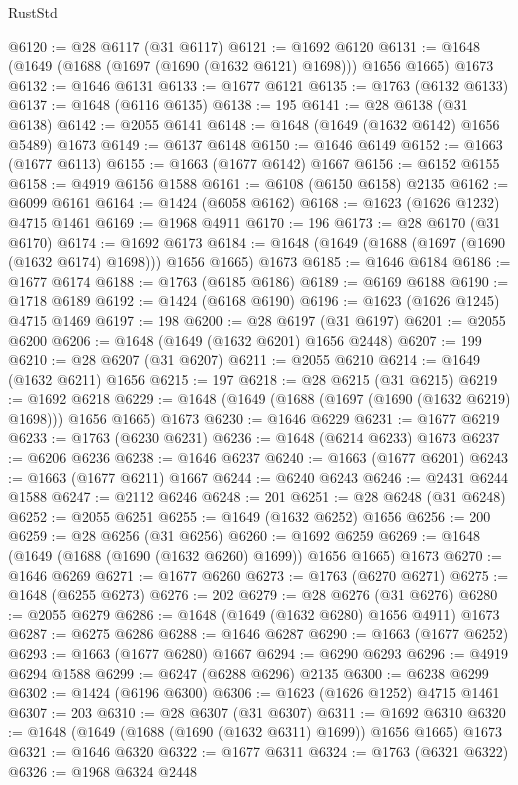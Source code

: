 \begin{lexlean}{RustStd}
\begin{coremodule}
@6120 := @28 @6117 (@31 @6117)
@6121 := @1692 @6120
@6131 := @1648 (@1649 (@1688 (@1697 (@1690 (@1632 @6121) @1698))) @1656 @1665) @1673
@6132 := @1646 @6131
@6133 := @1677 @6121
@6135 := @1763 (@6132 @6133)
@6137 := @1648 (@6116 @6135)
@6138 := 195
@6141 := @28 @6138 (@31 @6138)
@6142 := @2055 @6141
@6148 := @1648 (@1649 (@1632 @6142) @1656 @5489) @1673
@6149 := @6137 @6148
@6150 := @1646 @6149
@6152 := @1663 (@1677 @6113)
@6155 := @1663 (@1677 @6142) @1667
@6156 := @6152 @6155
@6158 := @4919 @6156 @1588
@6161 := @6108 (@6150 @6158) @2135
@6162 := @6099 @6161
@6164 := @1424 (@6058 @6162)
@6168 := @1623 (@1626 @1232) @4715 @1461
@6169 := @1968 @4911
@6170 := 196
@6173 := @28 @6170 (@31 @6170)
@6174 := @1692 @6173
@6184 := @1648 (@1649 (@1688 (@1697 (@1690 (@1632 @6174) @1698))) @1656 @1665) @1673
@6185 := @1646 @6184
@6186 := @1677 @6174
@6188 := @1763 (@6185 @6186)
@6189 := @6169 @6188
@6190 := @1718 @6189
@6192 := @1424 (@6168 @6190)
@6196 := @1623 (@1626 @1245) @4715 @1469
@6197 := 198
@6200 := @28 @6197 (@31 @6197)
@6201 := @2055 @6200
@6206 := @1648 (@1649 (@1632 @6201) @1656 @2448)
@6207 := 199
@6210 := @28 @6207 (@31 @6207)
@6211 := @2055 @6210
@6214 := @1649 (@1632 @6211) @1656
@6215 := 197
@6218 := @28 @6215 (@31 @6215)
@6219 := @1692 @6218
@6229 := @1648 (@1649 (@1688 (@1697 (@1690 (@1632 @6219) @1698))) @1656 @1665) @1673
@6230 := @1646 @6229
@6231 := @1677 @6219
@6233 := @1763 (@6230 @6231)
@6236 := @1648 (@6214 @6233) @1673
@6237 := @6206 @6236
@6238 := @1646 @6237
@6240 := @1663 (@1677 @6201)
@6243 := @1663 (@1677 @6211) @1667
@6244 := @6240 @6243
@6246 := @2431 @6244 @1588
@6247 := @2112 @6246
@6248 := 201
@6251 := @28 @6248 (@31 @6248)
@6252 := @2055 @6251
@6255 := @1649 (@1632 @6252) @1656
@6256 := 200
@6259 := @28 @6256 (@31 @6256)
@6260 := @1692 @6259
@6269 := @1648 (@1649 (@1688 (@1690 (@1632 @6260) @1699)) @1656 @1665) @1673
@6270 := @1646 @6269
@6271 := @1677 @6260
@6273 := @1763 (@6270 @6271)
@6275 := @1648 (@6255 @6273)
@6276 := 202
@6279 := @28 @6276 (@31 @6276)
@6280 := @2055 @6279
@6286 := @1648 (@1649 (@1632 @6280) @1656 @4911) @1673
@6287 := @6275 @6286
@6288 := @1646 @6287
@6290 := @1663 (@1677 @6252)
@6293 := @1663 (@1677 @6280) @1667
@6294 := @6290 @6293
@6296 := @4919 @6294 @1588
@6299 := @6247 (@6288 @6296) @2135
@6300 := @6238 @6299
@6302 := @1424 (@6196 @6300)
@6306 := @1623 (@1626 @1252) @4715 @1461
@6307 := 203
@6310 := @28 @6307 (@31 @6307)
@6311 := @1692 @6310
@6320 := @1648 (@1649 (@1688 (@1690 (@1632 @6311) @1699)) @1656 @1665) @1673
@6321 := @1646 @6320
@6322 := @1677 @6311
@6324 := @1763 (@6321 @6322)
@6326 := @1968 @6324 @2448

\end{coremodule}
\end{lexlean}
